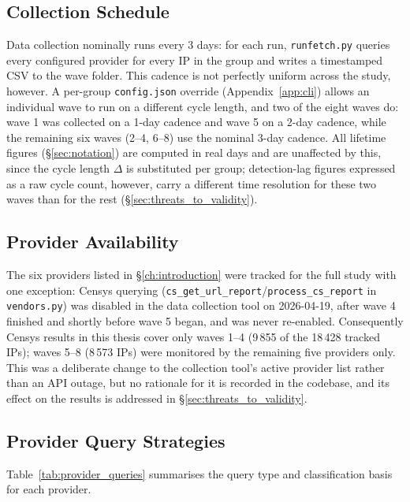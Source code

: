 \documentclass[12pt, a4paper, twoside]{report}
\begin{document}
\subsection{Collection Schedule}
\label{sec:collection_schedule}

Data collection nominally runs every 3 days: for each run, \texttt{runfetch.py} queries every
configured provider for every IP in the group and writes a timestamped CSV to the wave folder.
This cadence is not perfectly uniform across the study, however. A per-group \texttt{config.json}
override (Appendix~\ref{app:cli}) allows an individual wave to run on a different cycle length, and
two of the eight waves do: wave 1 was collected on a 1-day cadence and wave 5 on a 2-day cadence,
while the remaining six waves (2--4, 6--8) use the nominal 3-day cadence. All lifetime figures
(\S\ref{sec:notation}) are computed in real days and are unaffected by this, since the cycle length
$\Delta$ is substituted per group; detection-lag figures expressed as a raw cycle count, however,
carry a different time resolution for these two waves than for the rest (\S\ref{sec:threats_to_validity}).

\subsection{Provider Availability}
\label{sec:provider_availability}

The six providers listed in \S\ref{ch:introduction} were tracked for the full study with one
exception: Censys querying (\texttt{cs\_get\_url\_report}/\texttt{process\_cs\_report} in
\texttt{vendors.py}) was disabled in the data collection tool on 2026-04-19, after wave 4 finished
and shortly before wave 5 began, and was never re-enabled. Consequently Censys results in this
thesis cover only waves 1--4 (9\,855 of the 18\,428 tracked IPs); waves 5--8 (8\,573 IPs) were
monitored by the remaining five providers only. This was a deliberate change to the collection
tool's active provider list rather than an API outage, but no rationale for it is recorded in the
codebase, and its effect on the results is addressed in \S\ref{sec:threats_to_validity}.

\subsection{Provider Query Strategies}

Table~\ref{tab:provider_queries} summarises the query type and classification basis for each
provider.
\end{document}
